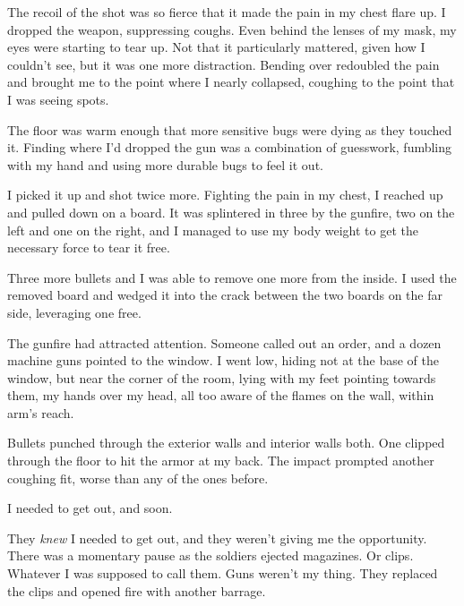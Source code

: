 The recoil of the shot was so fierce that it made the pain in my chest flare up.  I dropped the weapon, suppressing coughs.  Even behind the lenses of my mask, my eyes were starting to tear up.  Not that it particularly mattered, given how I couldn't see, but it was one more distraction.  Bending over redoubled the pain and brought me to the point where I nearly collapsed, coughing to the point that I was seeing spots.



The floor was warm enough that more sensitive bugs were dying as they touched it.  Finding where I'd dropped the gun was a combination of guesswork, fumbling with my hand and using more durable bugs to feel it out.



I picked it up and shot twice more.  Fighting the pain in my chest, I reached up and pulled down on a board.  It was splintered in three by the gunfire, two on the left and one on the right, and I managed to use my body weight to get the necessary force to tear it free.



Three more bullets and I was able to remove one more from the inside.  I used the removed board and wedged it into the crack between the two boards on the far side, leveraging one free.



The gunfire had attracted attention.  Someone called out an order, and a dozen machine guns pointed to the window.  I went low, hiding not at the base of the window, but near the corner of the room, lying with my feet pointing towards them, my hands over my head, all too aware of the flames on the wall, within arm's reach.



Bullets punched through the exterior walls and interior walls both.  One clipped through the floor to hit the armor at my back.  The impact prompted another coughing fit, worse than any of the ones before.



I needed to get out, and soon.



They \emph{knew }I needed to get out, and they weren't giving me the opportunity.  There was a momentary pause as the soldiers ejected magazines.  Or clips.  Whatever I was supposed to call them.  Guns weren't my thing.  They replaced the clips and opened fire with another barrage.



